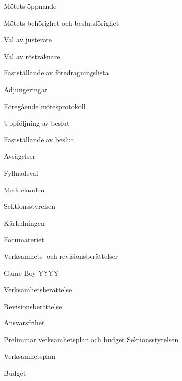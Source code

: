 \documentclass[prelim]{sektionsmote}
\begin{document}
\maketitle

\begin{ootd}

\item{Mötets öppnande}

\item{Mötets behörighet och beslutsförighet}

\item{Val av justerare}

\item{Val av rösträknare}

\item{Fastställande av föredragningslista}

\item{Adjungeringar}

\item{Föregående mötesprotokoll}

\item{Uppföljning av beslut}

\item{Fastställande av beslut}
\begin{ootd}
    \item Avsägelser
    \item Fyllnadsval
\end{ootd}

\item{Meddelanden}
\begin{ootd}
    \item Sektionsstyrelsen
    \item Kårledningen
    \item Focumateriet
\end{ootd}

\item{Verksamhets- och revisionsberättelser}
  \item Game Boy YYYY
  \begin{ootd}
    \item Verksamhetsberättelse
    \item Revisionsberättelse
    \item Ansvarsfrihet
  \end{ootd}
\end{ootd}

\item{Preliminär verksamhetsplan och budget Sektionsstyrelsen}
\begin{ootd}
  \item Verksamhetsplan
  \item Budget
\end{ootd}
\end{document}
